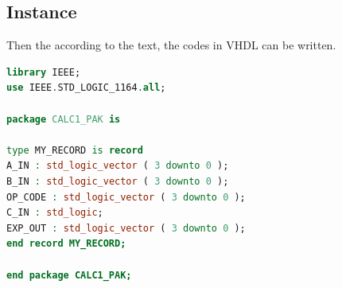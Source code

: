 \documentclass{article}
\begin{document}
    \subsection{Instance}
    
    Then the according to the text, the codes in VHDL can be written.
    
    \begin{lstlisting}[language=VHDL,caption=CALC1 package]
library IEEE;
use IEEE.STD_LOGIC_1164.all;

package CALC1_PAK is

type MY_RECORD is record
A_IN : std_logic_vector ( 3 downto 0 ); 
B_IN : std_logic_vector ( 3 downto 0 );
OP_CODE : std_logic_vector ( 3 downto 0 );
C_IN : std_logic;
EXP_OUT : std_logic_vector ( 3 downto 0 );
end record MY_RECORD;

end package CALC1_PAK;
    \end{lstlisting}
    
\end{document}
